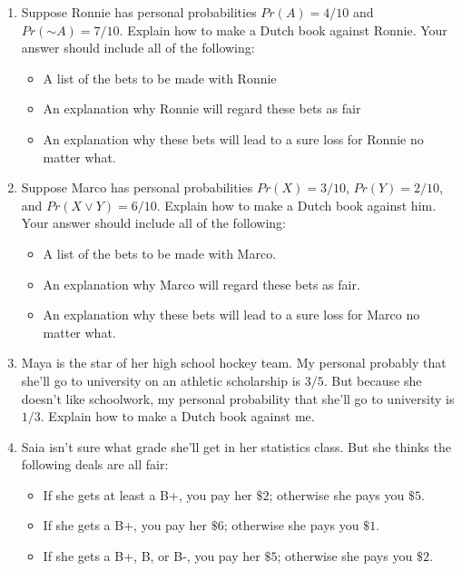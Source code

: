 \documentclass[justified]{tufte-book}
\providecommand{\tightlist}{%
  \setlength{\itemsep}{0pt}\setlength{\parskip}{0pt}}
\renewcommand{\neg}{\mathbin{\sim}}
\newcommand{\p}{Pr}
\theoremstyle{definition}
\theoremstyle{definition}
\theoremstyle{definition}
\theoremstyle{remark}
\begin{document}
\begin{enumerate}
\item
  Suppose Ronnie has personal probabilities \(\p(A) = 4/10\) and
  \(\p(\neg A) = 7/10\). Explain how to make a Dutch book against
  Ronnie. Your answer should include all of the following:

  \begin{itemize}
  \tightlist
  \item
    A list of the bets to be made with Ronnie
  \item
    An explanation why Ronnie will regard these bets as fair
  \item
    An explanation why these bets will lead to a sure loss for Ronnie no
    matter what.
  \end{itemize}
\item
  Suppose Marco has personal probabilities \(\p(X) = 3/10\),
  \(\p(Y) = 2/10\), and \(\p(X \vee Y) = 6/10\). Explain how to make a
  Dutch book against him. Your answer should include all of the
  following:

  \begin{itemize}
  \tightlist
  \item
    A list of the bets to be made with Marco.
  \item
    An explanation why Marco will regard these bets as fair.
  \item
    An explanation why these bets will lead to a sure loss for Marco no
    matter what.
  \end{itemize}
\item
  Maya is the star of her high school hockey team. My personal probably
  that she'll go to university on an athletic scholarship is \(3/5\).
  But because she doesn't like schoolwork, my personal probability that
  she'll go to university is \(1/3\). Explain how to make a Dutch book
  against me.
\item
  Saia isn't sure what grade she'll get in her statistics class. But she
  thinks the following deals are all fair:

  \begin{itemize}
  \tightlist
  \item
    If she gets at least a B+, you pay her \(\$2\); otherwise she pays
    you \(\$5\).
  \item
    If she gets a B+, you pay her \(\$6\); otherwise she pays you
    \(\$1\).
  \item
    If she gets a B+, B, or B-, you pay her \(\$5\); otherwise she pays
    you \(\$2\).
  \end{itemize}


\end{enumerate}
\end{document}
